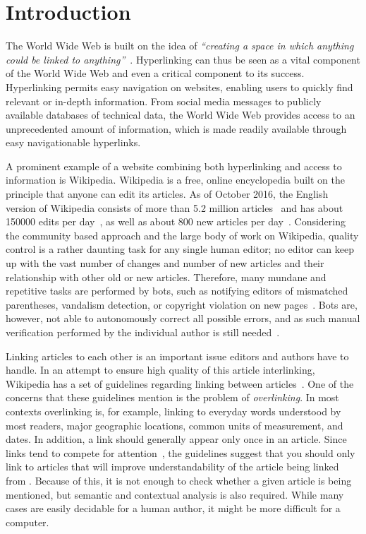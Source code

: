 \chapter{Introduction}\label{ch:introduction}
The World Wide Web is built on the idea of \emph{``creating a space in which anything could be linked to anything''}~\cite[p.~4]{Weaving-the-web}. Hyperlinking can thus be seen as a vital component of the World Wide Web and even a critical component to its success. Hyperlinking permits easy navigation on websites, enabling users to quickly find relevant or in-depth information. From social media messages to publicly available databases of technical data, the World Wide Web provides access to an unprecedented amount of information, which is made readily available through easy navigationable hyperlinks.

A prominent example of a website combining both hyperlinking and access to information is Wikipedia. Wikipedia is a free, online encyclopedia built on the principle that anyone can edit its articles. As of October 2016, the English version of Wikipedia consists of more than 5.2 million articles~\cite{wiki-about} and has about \num{150000} edits per day~\cite{wiki-num-edits}, as well as about 800 new articles per day~\cite{wmcharts}. Considering the community based approach and the large body of work on Wikipedia, quality control is a rather daunting task for any single human editor; no editor can keep up with the vast number of changes and number of new articles and their relationship with other old or new articles. Therefore, many mundane and repetitive tasks are performed by bots, such as notifying editors of mismatched parentheses, vandalism detection, or copyright violation on new pages~\cite{wiki-bots}. Bots are, however, not able to autonomously correct all possible errors, and as such manual verification performed by the individual author is still needed~\cite{wiki-editor-guidelines}. 

Linking articles to each other is an important issue editors and authors have to handle. In an attempt to ensure high quality of this article interlinking, Wikipedia has a set of guidelines regarding linking between articles~\cite{wiki-manual-of-style-overlinking}. One of the concerns that these guidelines mention is the problem of \emph{overlinking}. In most contexts overlinking is, for example, linking to everyday words understood by most readers, major geographic locations, common units of measurement, and dates. In addition, a link should generally appear only once in an article. Since links tend to compete for attention~\cite{hyperlink-structure-using-logs}, the guidelines suggest that you should only link to articles that will improve understandability of the article being linked from . Because of this, it is not enough to check whether a given article is being mentioned, but semantic and contextual analysis is also required. While many cases are easily decidable for a human author, it might be more difficult for a computer.






